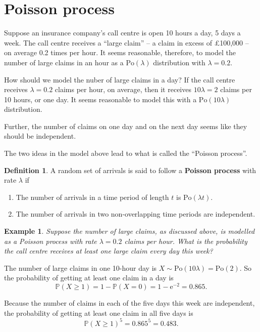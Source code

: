 \documentclass[
  a4paper,
]{book}
\providecommand{\tightlist}{%
  \setlength{\itemsep}{0pt}\setlength{\parskip}{0pt}}
\theoremstyle{definition}
\newtheorem{definition}{Definition}[chapter]
\theoremstyle{definition}
\newtheorem{example}{Example}[chapter]
\theoremstyle{definition}
\theoremstyle{definition}
\theoremstyle{remark}
\begin{document}
\hypertarget{poisson-process}{%
\section{Poisson process}\label{poisson-process}}

Suppose an insurance company's call centre is open 10 hours a day, 5 days a week. The call centre receives a ``large claim'' -- a claim in excess of £100,000 -- on average 0.2 times per hour. It seems reasonable, therefore, to model the number of large claims in an hour as a \(\mathrm{Po}(\lambda)\) distribution with \(\lambda = 0.2\).

How should we model the nuber of large claims in a day? If the call centre receives \(\lambda = 0.2\) claims per hour, on average, then it receives \(10\lambda = 2\) claims per 10 hours, or one day. It seems reasonable to model this with a \(\mathrm{Po}(10\lambda)\) distribution.

Further, the number of claims on one day and on the next day seems like they should be independent.

The two ideas in the model above lead to what is called the ``Poisson process''.

\begin{definition}

A random set of arrivals is said to follow a \textbf{Poisson process} with rate \(\lambda\) if

\begin{enumerate}
\def\labelenumi{\arabic{enumi}.}
\tightlist
\item
  The number of arrivals in a time period of length \(t\) is \(\mathrm{Po}(\lambda t)\).
\item
  The number of arrivals in two non-overlapping time periods are independent.
\end{enumerate}

\end{definition}

\begin{example}
\emph{Suppose the number of large claims, as discussed above, is modelled as a Poisson process with rate \(\lambda = 0.2\) claims per hour. What is the probability the call centre receives at least one large claim every day this week?}

The number of large claims in one 10-hour day is \(X \sim \mathrm{Po}(10\lambda) = \mathrm{Po}(2)\). So the probability of getting at least one claim in a day is
\[ \mathbb P(X \geq 1) = 1 - \mathbb P(X = 0) = 1 - \mathrm{e}^{-2} = 0.865 . \]

Because the number of claims in each of the five days this week are independent, the probability of getting at least one claim in all five days is
\[ \mathbb P(X \geq 1)^5 = 0.865^5 = 0.483 . \]
\end{example}
\end{document}
